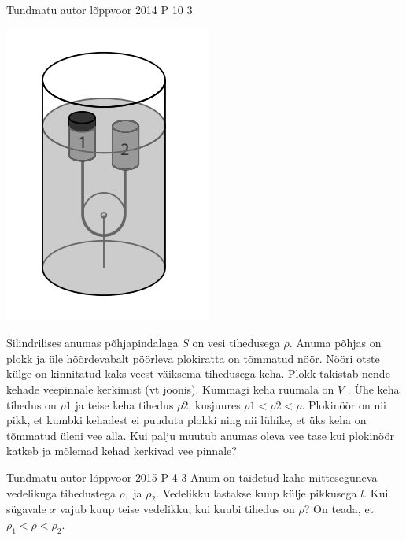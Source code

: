 \documentclass[11pt]{article}
\begin{document}
{%
{Tundmatu autor} %
{lõppvoor} %
{2014} %
{P 10} %
{3} %
{
\ifStatement
\begin{center}
	\includegraphics[width=0.5\linewidth]{2014-v3p-10-yl.PNG}
\end{center}
Silindrilises anumas põhjapindalaga $S$ on vesi tihedusega $\rho$. Anuma põhjas on plokk ja üle hõõrdevabalt pöörleva plokiratta on tõmmatud nöör. Nööri otste külge on kinnitatud kaks veest väiksema tihedusega keha. Plokk takistab nende kehade veepinnale kerkimist (vt joonis). Kummagi keha ruumala on $V$ . Ühe keha tihedus on $\rho 1$ ja teise keha tihedus $ \rho 2$, kusjuures $\rho1 < \rho2 < \rho$. Plokinöör on nii pikk, et kumbki kehadest ei puuduta plokki ning nii lühike, et üks keha on tõmmatud üleni vee alla. Kui palju muutub anumas oleva vee tase kui plokinöör katkeb ja mõlemad kehad kerkivad vee pinnale?
\fi
}

{Tundmatu autor} %
{lõppvoor} %
{2015} %
{P 4} %
{3} %
{
\ifStatement
Anum on täidetud kahe mitteseguneva vedelikuga tihedustega $\rho_1$ ja $\rho_2$. Vedelikku lastakse kuup külje pikkusega $l$. Kui sügavale $x$ vajub kuup teise vedelikku, kui kuubi tihedus on $\rho$? On teada, et $\rho_1 < \rho < \rho_2$.
\fi
}

}
\end{document}
